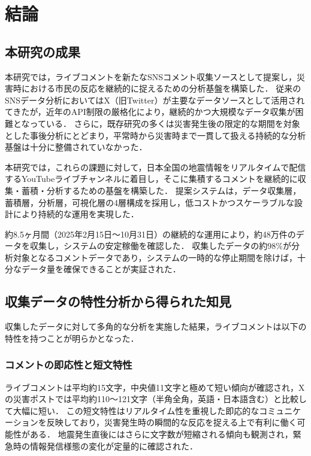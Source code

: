 \chapter{結論}

\section{本研究の成果}

本研究では，ライブコメントを新たなSNSコメント収集ソースとして提案し，災害時における市民の反応を継続的に捉えるための分析基盤を構築した．
従来のSNSデータ分析においてはX（旧Twitter）が主要なデータソースとして活用されてきたが，近年のAPI制限の厳格化により，継続的かつ大規模なデータ収集が困難となっている．
さらに，既存研究の多くは災害発生後の限定的な期間を対象とした事後分析にとどまり，平常時から災害時まで一貫して扱える持続的な分析基盤は十分に整備されていなかった．

本研究では，これらの課題に対して，日本全国の地震情報をリアルタイムで配信するYouTubeライブチャンネルに着目し，そこに集積するコメントを継続的に収集・蓄積・分析するための基盤を構築した．
提案システムは，データ収集層，蓄積層，分析層，可視化層の4層構成を採用し，低コストかつスケーラブルな設計により持続的な運用を実現した．

約8.5ヶ月間（2025年2月15日～10月31日）の継続的な運用により，約48万件のデータを収集し，システムの安定稼働を確認した．
収集したデータの約98\%が分析対象となるコメントデータであり，システムの一時的な停止期間を除けば，十分なデータ量を確保できることが実証された．

\section{収集データの特性分析から得られた知見}

収集したデータに対して多角的な分析を実施した結果，ライブコメントは以下の特性を持つことが明らかとなった．

\subsection{コメントの即応性と短文特性}

ライブコメントは平均約15文字，中央値11文字と極めて短い傾向が確認され，Xの災害ポストでは平均約110〜121文字（半角全角，英語・日本語含む）と比較して大幅に短い．
この短文特性はリアルタイム性を重視した即応的なコミュニケーションを反映しており，災害発生時の瞬間的な反応を捉える上で有利に働く可能性がある．
地震発生直後にはさらに文字数が短縮される傾向も観測され，緊急時の情報発信様態の変化が定量的に確認された．

